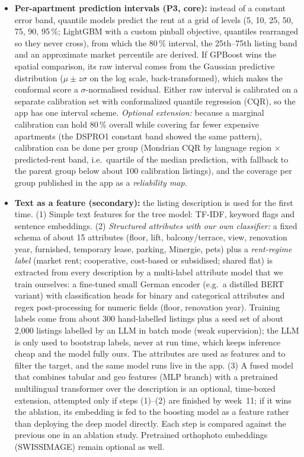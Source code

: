 \documentclass[11pt,a4paper]{article}
\begin{document}
\begin{itemize}
    \item \textbf{Per-apartment prediction intervals (P3, core):} instead of a constant error band, quantile models predict the rent at a grid of levels (5, 10, 25, 50, 75, 90, 95\,\%; LightGBM with a custom pinball objective, quantiles rearranged so they never cross), from which the 80\,\% interval, the 25th--75th listing band and an approximate market percentile are derived. If GPBoost wins the spatial comparison, its raw interval comes from the Gaussian predictive distribution ($\mu \pm z\sigma$ on the log scale, back-transformed), which makes the conformal score a $\sigma$-normalised residual. Either raw interval is calibrated on a separate calibration set with conformalized quantile regression (CQR), so the app has one interval scheme. \emph{Optional extension:} because a marginal calibration can hold 80\,\% overall while covering far fewer expensive apartments (the DSPRO1 constant band showed the same pattern), calibration can be done per group (Mondrian CQR by language region $\times$ predicted-rent band, i.e.\ quartile of the median prediction, with fallback to the parent group below about 100 calibration listings), and the coverage per group published in the app as a \emph{reliability map}.
    \item \textbf{Text as a feature (secondary):} the listing description is used for the first time. (1) Simple text features for the tree model: TF-IDF, keyword flags and sentence embeddings. (2) \emph{Structured attributes with our own classifier:} a fixed schema of about 15 attributes (floor, lift, balcony/terrace, view, renovation year, furnished, temporary lease, parking, Minergie, pets) plus a \emph{rent-regime label} (market rent; cooperative, cost-based or subsidised; shared flat) is extracted from every description by a multi-label attribute model that we train ourselves: a fine-tuned small German encoder (e.g.\ a distilled BERT variant) with classification heads for binary and categorical attributes and regex post-processing for numeric fields (floor, renovation year). Training labels come from about 300 hand-labelled listings plus a seed set of about 2{,}000 listings labelled by an LLM in batch mode (weak supervision); the LLM is only used to bootstrap labels, never at run time, which keeps inference cheap and the model fully ours. The attributes are used as features and to filter the target, and the same model runs live in the app. (3) A fused model that combines tabular and geo features (MLP branch) with a pretrained multilingual transformer over the description is an optional, time-boxed extension, attempted only if steps (1)--(2) are finished by week~11; if it wins the ablation, its embedding is fed to the boosting model as a feature rather than deploying the deep model directly. Each step is compared against the previous one in an ablation study. Pretrained orthophoto embeddings (SWISSIMAGE) remain optional as well.

\end{itemize}
\end{document}
